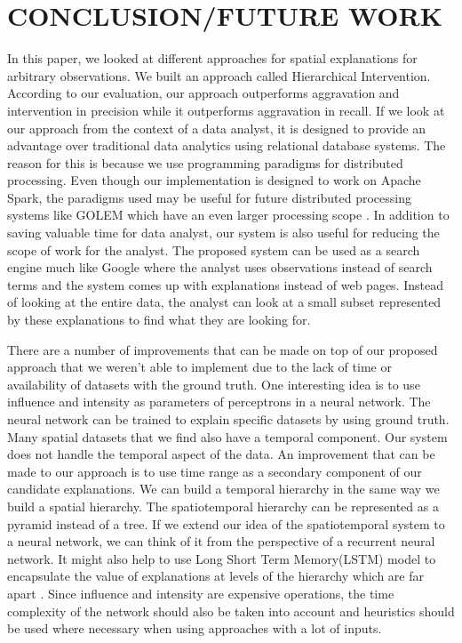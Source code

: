 \section{CONCLUSION/FUTURE WORK}
\label{chp:concl}
In this paper, we looked at different approaches for spatial explanations for arbitrary observations. We built an approach called Hierarchical Intervention. According to our evaluation, our approach outperforms aggravation and intervention in precision while it outperforms aggravation in recall. If we look at our approach from the context of a data analyst, it is designed to provide an advantage over traditional data analytics using relational database systems. The reason for this is because we use programming paradigms for distributed processing. Even though our implementation is designed to work on Apache Spark, the paradigms used may be useful for future distributed processing systems like GOLEM which have an even larger processing scope \citep{golem2018}. In addition to saving valuable time for data analyst, our system is also useful for reducing the scope of work for the analyst. The proposed system can be used as a search engine much like Google where the analyst uses observations instead of search terms and the system comes up with explanations instead of web pages. Instead of looking at the entire data, the analyst can look at a small subset represented by these explanations to find what they are looking for.

There are a number of improvements that can be made on top of our proposed approach that we weren't able to implement due to the lack of time or availability of datasets with the ground truth. One interesting idea is to use influence and intensity as parameters of perceptrons in a neural network\citep{grossberg1988nonlinear,widrow199030}. The neural network can be trained to explain specific datasets by using ground truth.
Many spatial datasets that we find also have a temporal component. Our system does not handle the temporal aspect of the data. An improvement that can be made to our approach is to use time range as a secondary component of our candidate explanations. We can build a temporal hierarchy in the same way we build a spatial hierarchy. The spatiotemporal hierarchy can be represented as a pyramid instead of a tree.
If we extend our idea of the spatiotemporal system to a neural network, we can think of it from the perspective of a recurrent neural network\citep{chung2016hierarchical}. It might also help to use Long Short Term Memory(LSTM) model to encapsulate the value of explanations at levels of the hierarchy which are far apart \citep{hochreiter1997long}.
Since influence and intensity are expensive operations, the time complexity of the network should also be taken into account and heuristics should be used where necessary when using approaches with a lot of inputs.

